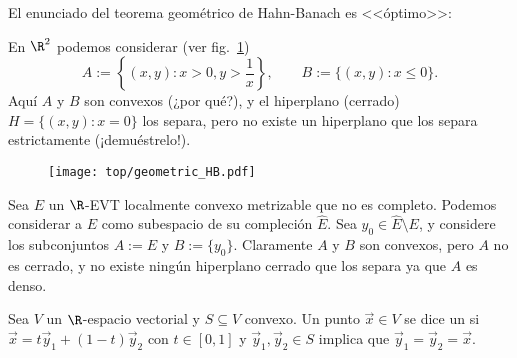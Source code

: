 \documentclass[topologia-analisis.tex]{subfiles}
\begin{document}
El enunciado del teorema geométrico de Hahn-Banach es <<óptimo>>:
\begin{exn}
	En $\R^2$ podemos considerar (ver fig.~\ref{fig:top/geometric_HB})
	\[
		A := \left\{ (x, y) : x > 0, y > \frac{1}{x} \right\}, \qquad B := \{ (x, y) : x \le 0 \}.
	\]
	Aquí $A$ y $B$ son convexos (¿por qué?), y el hiperplano (cerrado) $H = \{ (x, y) : x = 0 \}$ los separa,
	pero no existe un hiperplano que los separa estrictamente (¡demuéstrelo!).
	\begin{figure}[!hbtp]
		\centering
		\texttt{[image: top/geometric\_HB.pdf]}
		\caption{}%
		\label{fig:top/geometric_HB}
	\end{figure}
\end{exn}
\begin{ex}
	Sea $E$ un $\R$-EVT localmente convexo metrizable que no es completo.
	Podemos considerar a $E$ como subespacio de su compleción $\widehat{E}$.
	Sea $y_0 \in \widehat{E} \setminus E$, y considere los subconjuntos $A := E$ y $B := \{ y_0 \}$.
	Claramente $A$ y $B$ son convexos, pero $A$ no es cerrado, y no existe ningún hiperplano cerrado que los separa ya que $A$ es denso.
\end{ex}

\begin{mydef}
	Sea $V$ un $\R$-espacio vectorial y $S \subseteq V$ convexo.
	Un punto $\vec x \in V$ se dice un  si $\vec x = t\vec y_1 + (1 - t)\vec y_2$ con
	$t \in [0, 1]$ y $\vec y_1, \vec y_2 \in S$ implica que $\vec y_1 = \vec y_2 = \vec x$.
\end{mydef}
\end{document}
